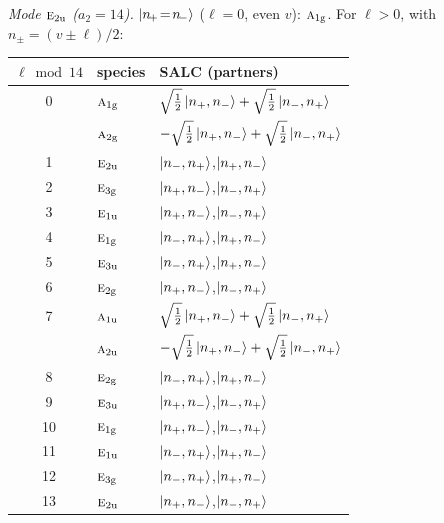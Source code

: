 \documentclass[11pt]{article}
\newcommand{\irr}[1]{\text{\normalfont\scshape #1}}
\newcommand{\ptag}[1]{\mathrm{#1}}
\begin{document}
\emph{Mode $\irr{e}_{2\ptag{u}}$ ($a_2=14$).} $\ket{n_{\!+}\!=\!n_{\!-}}$ ($\ell=0$, even $v$): $\irr{a}_{1\ptag{g}}$. For $\ell>0$, with $n_\pm=(v\pm\ell)/2$:
\begin{longtable}{c l l}\hline $\ell\bmod 14$ & species & SALC (partners)\\ \hline\endhead
0 & $\irr{a}_{1\ptag{g}}$ & $\sqrt{\tfrac{1}{2}}\ket{n_+,n_-}+\sqrt{\tfrac{1}{2}}\ket{n_-,n_+}$\\
 & $\irr{a}_{2\ptag{g}}$ & $-\sqrt{\tfrac{1}{2}}\ket{n_+,n_-}+\sqrt{\tfrac{1}{2}}\ket{n_-,n_+}$\\
1 & $\irr{e}_{2\ptag{u}}$ & $\ket{n_-,n_+}$,\quad $\ket{n_+,n_-}$\\
2 & $\irr{e}_{3\ptag{g}}$ & $\ket{n_+,n_-}$,\quad $\ket{n_-,n_+}$\\
3 & $\irr{e}_{1\ptag{u}}$ & $\ket{n_+,n_-}$,\quad $\ket{n_-,n_+}$\\
4 & $\irr{e}_{1\ptag{g}}$ & $\ket{n_-,n_+}$,\quad $\ket{n_+,n_-}$\\
5 & $\irr{e}_{3\ptag{u}}$ & $\ket{n_-,n_+}$,\quad $\ket{n_+,n_-}$\\
6 & $\irr{e}_{2\ptag{g}}$ & $\ket{n_+,n_-}$,\quad $\ket{n_-,n_+}$\\
7 & $\irr{a}_{1\ptag{u}}$ & $\sqrt{\tfrac{1}{2}}\ket{n_+,n_-}+\sqrt{\tfrac{1}{2}}\ket{n_-,n_+}$\\
 & $\irr{a}_{2\ptag{u}}$ & $-\sqrt{\tfrac{1}{2}}\ket{n_+,n_-}+\sqrt{\tfrac{1}{2}}\ket{n_-,n_+}$\\
8 & $\irr{e}_{2\ptag{g}}$ & $\ket{n_-,n_+}$,\quad $\ket{n_+,n_-}$\\
9 & $\irr{e}_{3\ptag{u}}$ & $\ket{n_+,n_-}$,\quad $\ket{n_-,n_+}$\\
10 & $\irr{e}_{1\ptag{g}}$ & $\ket{n_+,n_-}$,\quad $\ket{n_-,n_+}$\\
11 & $\irr{e}_{1\ptag{u}}$ & $\ket{n_-,n_+}$,\quad $\ket{n_+,n_-}$\\
12 & $\irr{e}_{3\ptag{g}}$ & $\ket{n_-,n_+}$,\quad $\ket{n_+,n_-}$\\
13 & $\irr{e}_{2\ptag{u}}$ & $\ket{n_+,n_-}$,\quad $\ket{n_-,n_+}$\\
\hline\end{longtable}
\end{document}
